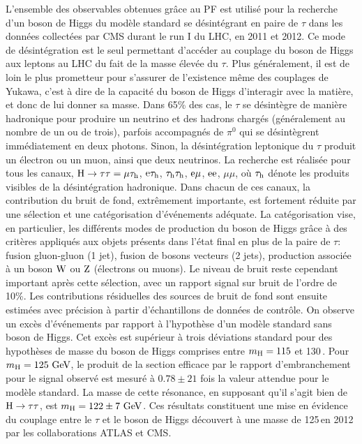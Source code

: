 \documentclass[11pt,twoside,a4paper,tdr]{cms-tdr}
\newcommand{\tauh}{\tau_{\rm h}}
\begin{document}
L'ensemble des observables obtenues grâce au PF est utilisé pour la recherche d'un boson de Higgs du modèle standard se désintégrant en paire de $\tau$ dans les données collectées par CMS durant le run I du LHC, en 2011 et 2012. 
Ce mode de désintégration est le seul permettant d'accéder au couplage du boson de Higgs aux leptons au LHC du fait de la masse élevée du $\tau$. 
Plus généralement, il est de loin le plus prometteur pour s'assurer de l'existence même des couplages de Yukawa, 
c'est à dire de la capacité du boson de Higgs d'interagir avec la matière, et donc de lui donner sa masse. 
Dans 65\% des cas, le $\tau$ se désintègre de manière hadronique pour produire un neutrino et des hadrons chargés (généralement au nombre de un ou de trois), parfois accompagnés de $\pi^0$ qui se désintègrent immédiatement en deux photons. Sinon, la désintégration leptonique du $\tau$ produit un électron ou un muon, ainsi que deux neutrinos.
La recherche est réalisée pour tous les canaux, $\PH \to \tau \tau = \mu \tauh$, $\Pe\tauh$, $\tauh \tauh$,  $\mathrm{e} \mu$, $\mathrm{e} \mathrm{e}$, $\mu \mu$, où $\tauh$ dénote les produits visibles de la désintégration hadronique.
Dans chacun de ces canaux, la contribution du bruit de fond, extrêmement importante, est fortement réduite par une sélection et une catégorisation d'événements adéquate. 
La catégorisation vise, en particulier, les différents modes de production du boson de Higgs grâce à des critères appliqués aux objets présents dans l'état final en plus de la paire de $\tau$: fusion gluon-gluon (1 jet), fusion de bosons vecteurs (2 jets), production associée à un boson $\mathrm{W}$ ou $\mathrm{Z}$ (électrons ou muons).
Le niveau de bruit reste cependant important après cette sélection, avec un rapport signal sur bruit de l'ordre de 10\%. 
Les contributions résiduelles des sources de bruit de fond sont ensuite estimées avec précision à partir d'échantillons de données de contrôle. 
On observe un excès d'événements par rapport à l'hypothèse d'un modèle standard sans boson de Higgs. 
Cet excès est supérieur à trois déviations standard pour des hypothèses de masse du boson de Higgs comprises entre $m_{\rm H} = 115$ et 130\,\GeV. 
Pour $m_{\rm H} = 125\,\,\text{Ge\hspace{-.08em}V}$, le produit de la section efficace par le rapport d'embranchement pour le signal observé est mesuré à $0.78 \pm 21$ fois la valeur attendue pour le modèle standard. 
La masse de cette résonance, en supposant qu'il s'agit bien de $\mathrm{H} \to \tau \tau$, est $m_{\rm H} = 122 \pm 7\,\,\text{Ge\hspace{-.08em}V}$. 
Ces résultats constituent une mise en évidence du couplage entre le $\tau$ et le boson de Higgs découvert à une masse de 125\,\GeV en 2012 par les collaborations ATLAS et CMS. 
\end{document}
